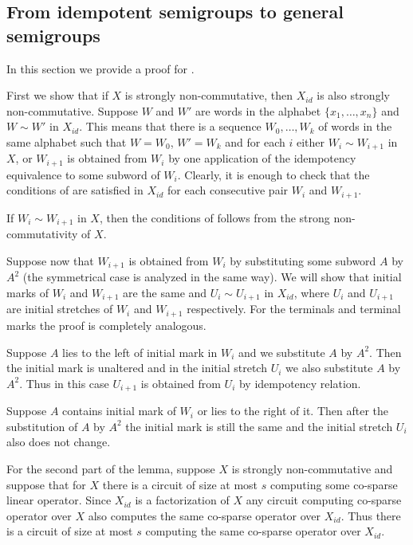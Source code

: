 \subsection{From idempotent semigroups to general semigroups}\label{sec:noncommutative_extension}

In this section we provide a proof for .


First we show that if $X$ is strongly non-commutative, then $X_{id}$ is also strongly non-commutative.
Suppose $W$ and $W'$ are words in the alphabet $\{x_1,\ldots, x_n\}$ and $W \sim W'$ in $X_{id}$. This means that there is a sequence $W_0,\ldots, W_k$ of words in the same alphabet such that $W=W_0$, $W'=W_k$ and for each $i$ either $W_i \sim W_{i+1}$ in $X$, or $W_{i+1}$ is obtained from $W_i$ by one application of the idempotency equivalence to some subword of $W_i$. Clearly, it is enough to check that the conditions of  are satisfied in $X_{id}$ for each consecutive pair $W_i$ and $W_{i+1}$.

If $W_i \sim W_{i+1}$ in $X$, then the conditions of  follows from the strong non-commutativity of $X$.

Suppose now that $W_{i+1}$ is obtained from $W_{i}$ by substituting some subword $A$ by $A^2$ (the symmetrical case is analyzed in the same way). We will show that initial marks of $W_i$ and $W_{i+1}$ are the same and $U_{i} \sim U_{i+1}$ in $X_{id}$, where $U_{i}$ and $U_{i+1}$ are
%
%
initial stretches %
of $W_i$ and $W_{i+1}$ respectively. For the terminals and terminal marks the proof is completely analogous.

Suppose $A$ lies to the left of initial mark in $W_i$ and we substitute $A$ by $A^2$. Then the initial mark is unaltered and in the
%
%
initial stretch %
$U_i$ we also substitute $A$ by $A^2$. Thus in this case $U_{i+1}$ is obtained from $U_i$ by idempotency relation.

Suppose $A$ contains initial mark of $W_i$ or lies to the right of it. Then after the substitution of $A$ by $A^2$ the initial mark is still the same and the
%
%
initial stretch %
$U_i$ also does not change.


For the second part of the lemma, suppose $X$ is strongly non-commutative and suppose that for $X$ there is a circuit of size at most $s$ computing some
%
%
co-sparse
 linear operator.
Since $X_{id}$ is a factorization of $X$ any circuit computing
%
%
co-sparse
operator over $X$ also computes the same
%
%
co-sparse
operator over $X_{id}$. Thus there is a  circuit of size at most $s$ computing the same
%
%
co-sparse
operator over $X_{id}$.
%
%

